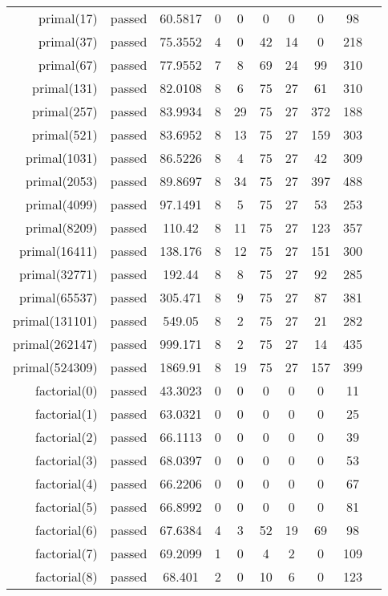 \begin{longtable}{r|ccccccccc}
    primal(17) & passed & 60.5817 & 0 & 0 & 0 & 0 & 0 & 98 \\
    primal(37) & passed & 75.3552 & 4 & 0 & 42 & 14 & 0 & 218 \\
    primal(67) & passed & 77.9552 & 7 & 8 & 69 & 24 & 99 & 310 \\
    primal(131) & passed & 82.0108 & 8 & 6 & 75 & 27 & 61 & 310 \\
    primal(257) & passed & 83.9934 & 8 & 29 & 75 & 27 & 372 & 188 \\
    primal(521) & passed & 83.6952 & 8 & 13 & 75 & 27 & 159 & 303 \\
    primal(1031) & passed & 86.5226 & 8 & 4 & 75 & 27 & 42 & 309 \\
    primal(2053) & passed & 89.8697 & 8 & 34 & 75 & 27 & 397 & 488 \\
    primal(4099) & passed & 97.1491 & 8 & 5 & 75 & 27 & 53 & 253 \\
    primal(8209) & passed & 110.42 & 8 & 11 & 75 & 27 & 123 & 357 \\
    primal(16411) & passed & 138.176 & 8 & 12 & 75 & 27 & 151 & 300 \\
    primal(32771) & passed & 192.44 & 8 & 8 & 75 & 27 & 92 & 285 \\
    primal(65537) & passed & 305.471 & 8 & 9 & 75 & 27 & 87 & 381 \\
    primal(131101) & passed & 549.05 & 8 & 2 & 75 & 27 & 21 & 282 \\
    primal(262147) & passed & 999.171 & 8 & 2 & 75 & 27 & 14 & 435 \\
    primal(524309) & passed & 1869.91 & 8 & 19 & 75 & 27 & 157 & 399 \\
    factorial(0) & passed & 43.3023 & 0 & 0 & 0 & 0 & 0 & 11 \\
    factorial(1) & passed & 63.0321 & 0 & 0 & 0 & 0 & 0 & 25 \\
    factorial(2) & passed & 66.1113 & 0 & 0 & 0 & 0 & 0 & 39 \\
    factorial(3) & passed & 68.0397 & 0 & 0 & 0 & 0 & 0 & 53 \\
    factorial(4) & passed & 66.2206 & 0 & 0 & 0 & 0 & 0 & 67 \\
    factorial(5) & passed & 66.8992 & 0 & 0 & 0 & 0 & 0 & 81 \\
    factorial(6) & passed & 67.6384 & 4 & 3 & 52 & 19 & 69 & 98 \\
    factorial(7) & passed & 69.2099 & 1 & 0 & 4 & 2 & 0 & 109 \\
    factorial(8) & passed & 68.401 & 2 & 0 & 10 & 6 & 0 & 123 \\

\end{longtable}
